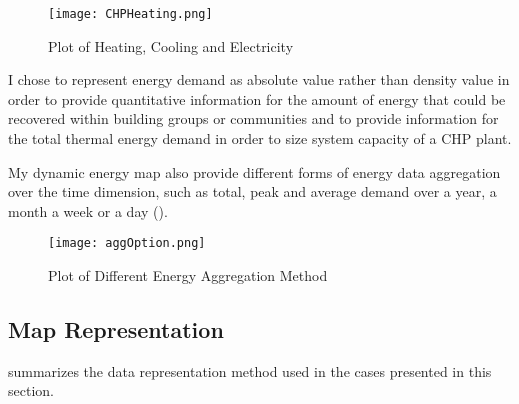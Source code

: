 \begin{figure}[h!]
  \centering
  \texttt{[image: CHPHeating.png]}
  \caption[Plot of Heating, Cooling and Electricity]{Plot of Heating, Cooling and Electricity}
  \label{fig:CHPHeating}
\end{figure}

I chose to represent energy demand as absolute value rather than
density value in order to provide quantitative information for the
amount of energy that could be recovered within building groups or
communities and to provide information for the total thermal energy
demand in order to size system capacity of a CHP plant. 

My dynamic energy map also provide different forms of energy data
aggregation over the time dimension, such as total, peak and average
demand over a year, a month a week or a day ().
\begin{figure}[h!]
  \centering
  \texttt{[image: aggOption.png]}
  \caption[Plot of Different Energy Aggregation Method]{Plot of Different Energy Aggregation Method}
  \label{fig:aggOption}
\end{figure}

\subsection{Map Representation}\label{sec:mapRepre}
 summarizes the data representation method used in
the cases presented in this section.

